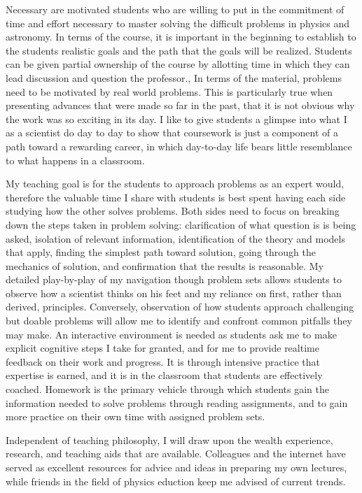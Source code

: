 \documentclass{article}
\begin{document}
Necessary are  motivated students who are willing to put in the commitment of time and effort
necessary to master solving the difficult problems in physics and astronomy.
In terms of the course,
it is important in the beginning to establish  to the students realistic goals and the path that the goals will be realized.
Students can be given partial ownership of the course by allotting time in which they can lead discussion and question the
professor.,
In terms of the material, problems need to be motivated by real world problems.
This is particularly true when presenting advances that were made so far in the past, that it is not obvious
why the work was so exciting in its day. 
I like to give students a glimpse into what I as a scientist do day to day to show that coursework
is just a component of a path toward a rewarding career, in which day-to-day life bears little resemblance to what
happens in a classroom.

My teaching goal is for the students to approach problems as an expert would, therefore
the valuable time I share with students is best spent having each side studying how the other
solves problems.  Both sides need to focus on breaking down the steps taken in problem solving: 
clarification of what question is is being asked,
isolation of relevant information, 
identification of the theory and models that apply, finding the simplest path toward solution,
going through the mechanics of solution, and confirmation that the results is reasonable.
My detailed play-by-play of my navigation though problem sets  allows students to observe how a scientist thinks on his
feet and my reliance on first, rather than derived, principles.  Conversely, observation of how students
approach challenging but doable problems will allow me to identify and confront common pitfalls they may make.
An interactive environment is needed as students ask me to make explicit cognitive steps I take for granted,
and for me to provide realtime feedback on their work and progress.
It is through intensive practice that expertise is earned, and it is in the classroom that students are effectively coached.
Homework is the primary vehicle through which students gain the information needed to solve problems
through reading assignments, and to gain more practice on their own time with assigned problem sets.

Independent of teaching philosophy, I will draw upon the wealth experience, research, and teaching aids that are
available.
Colleagues and the internet have served as excellent resources for advice and ideas in preparing
my own lectures, while friends in the field of physics eduction keep me advised of current trends. 
\end{document}
